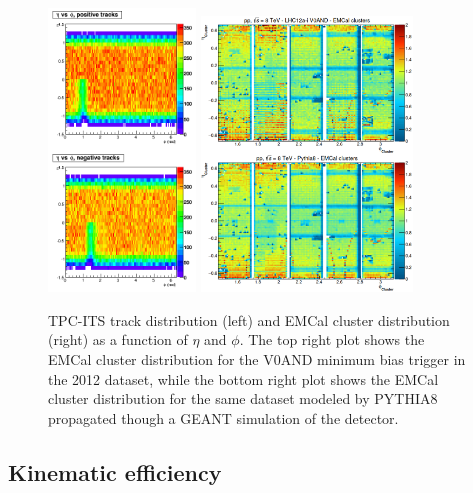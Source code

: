 \begin{figure}[hbt!]
    \centering
        \includegraphics[width=0.35\textwidth]{figures/EnergyScale/ROrdering/spd_holes.png}
        \includegraphics[width=0.5\textwidth]{figures/EnergyScale/ROrdering/emcal_occupancy_cropped.eps}
    \caption{TPC-ITS track distribution (left) and EMCal cluster distribution (right) as a function of $\eta$ and $\phi$. The top right plot shows the EMCal cluster distribution for the V0AND minimum bias trigger in the 2012 dataset, while the bottom right plot shows the EMCal cluster distribution for the same dataset modeled by PYTHIA8 propagated though a GEANT simulation of the detector.}
    \label{fig:eScaleTracksClusters}
\end{figure}

\subsection{Kinematic efficiency}
\label{sec:kinEff}


